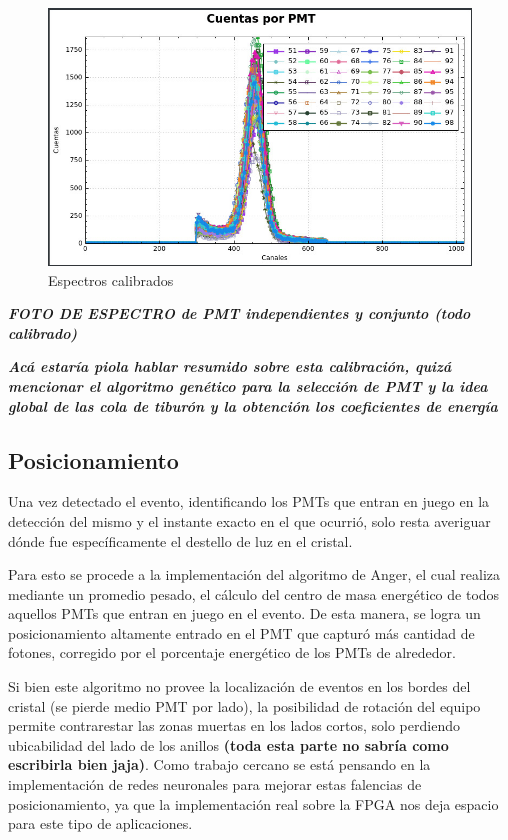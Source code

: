 \documentclass[conference]{IEEEtran}
\begin{document}
\begin{figure}[h]
\centering
\includegraphics[scale=0.2]{Espectro_Calibrado.jpeg}
\caption{Espectros calibrados}
\label{fig:Espectros calibrados}
\end{figure}

\textbf{\textit{FOTO DE ESPECTRO de PMT independientes y conjunto (todo calibrado)}
}%

\textbf{\textit{Acá estaría piola hablar resumido sobre esta calibración, quizá mencionar el algoritmo genético para la selección de PMT y la idea global de las cola de tiburón y la obtención los coeficientes de energía}}

\subsection{Posicionamiento}

Una vez detectado el evento, identificando los PMTs que entran en juego en la detección del mismo y el instante exacto en el que ocurrió, solo resta averiguar dónde fue específicamente el destello de luz en el cristal.

Para esto se procede a la implementación del algoritmo de Anger, el cual realiza mediante un promedio pesado, el cálculo del centro de masa energético de todos aquellos PMTs que entran en juego en el evento. De esta manera, se logra un posicionamiento altamente entrado en el PMT que capturó más cantidad de fotones, corregido por el porcentaje energético de los PMTs de alrededor.

Si bien este algoritmo no provee la localización de eventos en los bordes del cristal (se pierde medio PMT por lado), la posibilidad de rotación del equipo permite contrarestar las zonas muertas en los lados cortos, solo perdiendo ubicabilidad del lado de los anillos \textbf{(toda esta parte no sabría como escribirla bien jaja)}. Como trabajo cercano se está pensando en la implementación de redes neuronales para mejorar estas falencias de posicionamiento, ya que la implementación real sobre la FPGA nos deja espacio para este tipo de aplicaciones.
\end{document}
